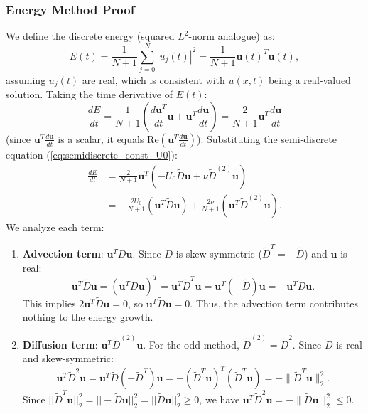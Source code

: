 \subsubsection{Energy Method Proof}
We define the discrete energy (squared $L^2$-norm analogue) as:
\begin{equation}
E(t) = \frac{1}{N+1} \sum_{j=0}^{N} |u_j(t)|^2 = \frac{1}{N+1} \mathbf{u}(t)^T \mathbf{u}(t),
\label{eq:discrete_energy}
\end{equation}
assuming $u_j(t)$ are real, which is consistent with $u(x,t)$ being a real-valued solution.
Taking the time derivative of $E(t)$:
\begin{equation}
\frac{dE}{dt} = \frac{1}{N+1} \left( \frac{d\mathbf{u}^T}{dt}\mathbf{u} + \mathbf{u}^T\frac{d\mathbf{u}}{dt} \right) = \frac{2}{N+1} \mathbf{u}^T \frac{d\mathbf{u}}{dt}
\label{eq:dEdt_general}
\end{equation}
(since $\mathbf{u}^T \frac{d\mathbf{u}}{dt}$ is a scalar, it equals $\text{Re}(\mathbf{u}^T \frac{d\mathbf{u}}{dt})$).
Substituting the semi-discrete equation (\ref{eq:semidiscrete_const_U0}):
\begin{equation}
\begin{aligned}
\frac{dE}{dt} &= \frac{2}{N+1} \mathbf{u}^T (-U_0 \tilde{D} \mathbf{u} + \nu \tilde{D}^{(2)} \mathbf{u}) \\
&= -\frac{2U_0}{N+1} (\mathbf{u}^T \tilde{D} \mathbf{u}) + \frac{2\nu}{N+1} (\mathbf{u}^T \tilde{D}^{(2)} \mathbf{u}).
\end{aligned}
\label{eq:dEdt_substituted}
\end{equation}
We analyze each term:
\begin{enumerate}
    \item \textbf{Advection term}: $\mathbf{u}^T \tilde{D} \mathbf{u}$. Since $\tilde{D}$ is skew-symmetric ($\tilde{D}^T = -\tilde{D}$) and $\mathbf{u}$ is real:
        \begin{equation}
        \mathbf{u}^T \tilde{D} \mathbf{u} = (\mathbf{u}^T \tilde{D} \mathbf{u})^T = \mathbf{u}^T \tilde{D}^T \mathbf{u} = \mathbf{u}^T (-\tilde{D}) \mathbf{u} = -\mathbf{u}^T \tilde{D} \mathbf{u}.
        \end{equation}
        This implies $2 \mathbf{u}^T \tilde{D} \mathbf{u} = 0$, so $\mathbf{u}^T \tilde{D} \mathbf{u} = 0$. Thus, the advection term contributes nothing to the energy growth.
    \item \textbf{Diffusion term}: $\mathbf{u}^T \tilde{D}^{(2)} \mathbf{u}$. For the odd method, $\tilde{D}^{(2)} = \tilde{D}^2$. Since $\tilde{D}$ is real and skew-symmetric:
        \begin{equation}
        \mathbf{u}^T \tilde{D}^2 \mathbf{u} = \mathbf{u}^T \tilde{D} (-\tilde{D}^T) \mathbf{u} = - (\tilde{D}^T\mathbf{u})^T (\tilde{D}^T\mathbf{u}) = -\|\tilde{D}^T\mathbf{u}\|_2^2.
        \end{equation}
        Since $||\tilde{D}^T\mathbf{u}||_2^2 = ||-\tilde{D}\mathbf{u}||_2^2 = ||\tilde{D}\mathbf{u}||_2^2 \ge 0$, we have $\mathbf{u}^T \tilde{D}^2 \mathbf{u} = -\|\tilde{D}\mathbf{u}\|_2^2 \leq 0$.
\end{enumerate}
